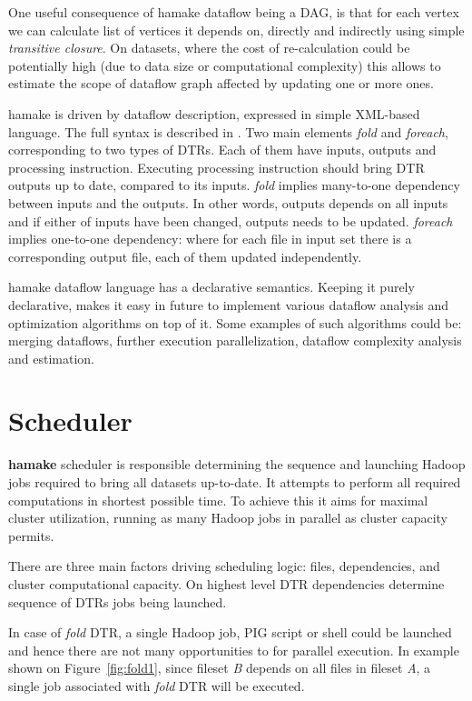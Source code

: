 \documentclass[10pt,conference,letterpaper]{IEEEtran}
\begin{document}
One useful consequence of hamake dataflow being a DAG, is that for
each vertex we can calculate list of vertices it depends on, directly
and indirectly using simple \textit{transitive closure}. On datasets,
where the cost of re-calculation could be potentially high (due to
data size or computational complexity) this allows to estimate the
scope of dataflow graph affected by updating one or more ones.

hamake is driven by dataflow description, expressed in simple
XML-based language. The full syntax is described in
\cite{hamakesyntax}. Two main elements \emph{fold} and \emph{foreach},
corresponding to two types of DTRs. Each of them have inputs, outputs
and processing instruction. Executing processing instruction should
bring DTR outputs up to date, compared to its inputs. \emph{fold}
implies many-to-one dependency between inputs and the outputs. In
other words, outputs depends on all inputs and if either of inputs
have been changed, outputs needs to be updated. \emph{foreach} implies
one-to-one dependency: where for each file in input set there is a
corresponding output file, each of them updated independently.

hamake dataflow language has a declarative semantics. Keeping it
purely declarative, makes it easy in future to implement various
dataflow analysis and optimization algorithms on top of it. Some
examples of such algorithms could be: merging dataflows, further
execution parallelization, dataflow complexity analysis and
estimation.

\section{Scheduler}

\textbf{hamake} scheduler is responsible determining the sequence and
launching Hadoop jobs required to bring all datasets up-to-date.  It
attempts to perform all required computations in shortest possible
time. To achieve this it aims for maximal cluster utilization, running
as many Hadoop jobs in parallel as cluster capacity permits.

There are three main factors driving scheduling logic: files,
dependencies, and cluster computational capacity. On highest level DTR
dependencies determine sequence of DTRs jobs being launched.

In case of \emph{fold} DTR, a single Hadoop job, PIG script or shell
could be launched and hence there are not many opportunities to for
parallel execution. In example shown on Figure~\ref{fig:fold1}, since
fileset \textit{B} depends on all files in fileset \textit{A}, a
single job associated with \emph{fold} DTR will be executed.
\end{document}
